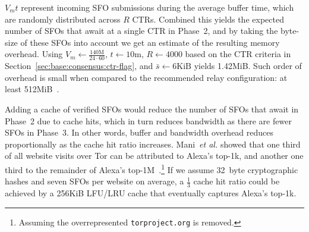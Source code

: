 $V_mt$ represent incoming SFO submissions during the average buffer time, which
are randomly distributed across $R$ CTRs.  Combined this yields the expected
number of SFOs that await at a single CTR in Phase~2, and by taking the
byte-size of these SFOs into account we get an estimate of the resulting memory
overhead.  Using
	$V_m \gets \frac{140\textrm{M}}{24\cdot60}$,
	$t \gets 10$m,
	$R \gets 4000$ based on the CTR criteria in
		Section~\ref{sec:base:consensus:ctr-flag}, and
	$\bar{s} \gets 6\textrm{KiB}$
yields 1.42MiB.  Such order of overhead is small when compared to the
recommended relay configuration:
	at least 512MiB~\cite{relay-config}.

Adding a cache of verified SFOs would reduce the number of SFOs that await in
Phase~2 due to cache hits, which in turn reduces bandwidth as there are fewer
SFOs in Phase~3.  In other words, buffer and bandwidth overhead reduces
proportionally as the cache hit ratio increases.  Mani~\emph{et al.} showed that
one third of all website visits over Tor can be attributed to Alexa's top-1k,
and another one third to the remainder of Alexa's top-1M~\cite{mani}.\footnote{%
	Assuming the overrepresented \texttt{torproject.org} is removed.
} If we assume 32~byte cryptographic hashes and seven SFOs per website on
average, a $\frac{1}{3}$ cache hit ratio could be achieved by a 256KiB LFU/LRU
cache that eventually captures Alexa's top-1k.
